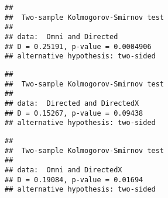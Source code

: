 \begin{verbatim}
## 
##  Two-sample Kolmogorov-Smirnov test
## 
## data:  Omni and Directed
## D = 0.25191, p-value = 0.0004906
## alternative hypothesis: two-sided
\end{verbatim}

\begin{Shaded}
\begin{Highlighting}[]
 \NormalTok{)}
\end{Highlighting}
\end{Shaded}
% 

\begin{verbatim}
## 
##  Two-sample Kolmogorov-Smirnov test
## 
## data:  Directed and DirectedX
## D = 0.15267, p-value = 0.09438
## alternative hypothesis: two-sided
\end{verbatim}

\begin{Shaded}
\begin{Highlighting}[]
 \NormalTok{)}
\end{Highlighting}
\end{Shaded}
% 

\begin{verbatim}
## 
##  Two-sample Kolmogorov-Smirnov test
## 
## data:  Omni and DirectedX
## D = 0.19084, p-value = 0.01694
## alternative hypothesis: two-sided
\end{verbatim}

 
